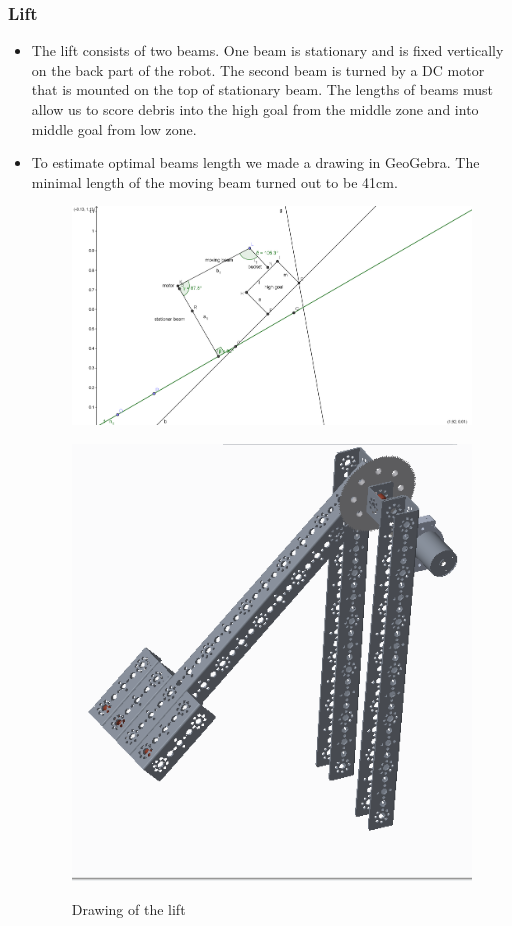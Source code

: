 
\subsubsection{Lift}
\begin{itemize}
\item The lift consists of two beams. One beam is stationary and is fixed vertically on the back part of the robot. The second beam is turned by a DC motor that is mounted on the top of stationary beam. The lengths of beams must allow us to score debris into the high goal from the middle zone and into middle goal from low zone.

\item To estimate optimal beams length we made a drawing in GeoGebra. The minimal length of the moving beam turned out to be 41cm.

\begin{figure}[H]
	\begin{minipage}[h]{0.6\linewidth}
		{\includegraphics[scale=0.7]{days_L/Lift+bucket/images/02}}
		\caption{Drawing of the lift}
	\end{minipage}
	\hfill
	\begin{minipage}[h]{0.6\linewidth}
		{\includegraphics[scale=0.7]{days_L/Lift+bucket/images/10}}

\end{minipage}
\end{figure}
\end{itemize}
